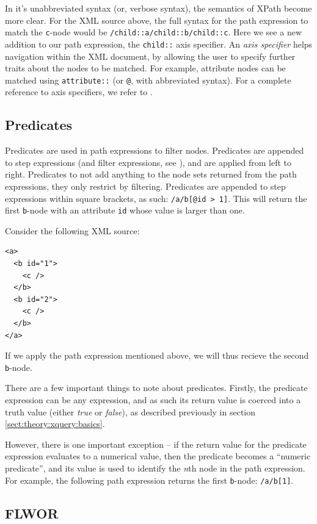In it's unabbreviated syntax (or, verbose syntax), the semantics of XPath
become more clear. For the XML source above, the full syntax for the path
expression to match the \verb!c!-node would be
\texttt{/child::a/child::b/child::c}. Here we see a new addition to our path
expression, the \verb!child::! axis specifier. An \textit{axis specifier} helps
navigation within the XML document, by allowing the user to specify further
traits about the nodes to be matched. For example, attribute nodes can be
matched using \verb!attribute::! (or \verb!@!, with abbreviated syntax). For a
complete reference to axis specifiers, we refer to \cite{w3c01}.

\subsection{Predicates}
\label{sect:theory:xquery:Predicates}
Predicates are used in path expressions to filter nodes. Predicates are
appended to step expressions (and filter expressions, see \cite{w3c01}), and
are applied from left to right. Predicates to not add anything to the node sets
returned from the path expressions, they only restrict by filtering. Predicates
are appended to step expressions within square brackets, as such:
\verb!/a/b[@id > 1]!. This will return the first \verb!b!-node with an
attribute \verb!id! whose value is larger than one.

Consider the following XML source:
\begin{Verbatim}
<a>
  <b id="1">
    <c />
  </b>
  <b id="2">
    <c />
  </b>
</a>
\end{Verbatim}
If we apply the path expression mentioned above, we will thus recieve the second
\verb!b!-node.

There are a few important things to note about predicates. Firstly, the
predicate expression can be any expression, and as such its return value is
coerced into a truth value (either \textit{true} or \textit{false}), as
described previously in section \ref{sect:theory:xquery:basics}.

However, there is one important exception -- if the return value for the
predicate expression evaluates to a numerical value, then the predicate
becomes a ``numeric predicate'', and its value is used to identify the
\textit{n}th node in the path expression. For example, the following path
expression returns the first \verb!b!-node: \verb!/a/b[1]!.

\subsection{FLWOR}
\label{sect:theory:xquery:Flwor}

